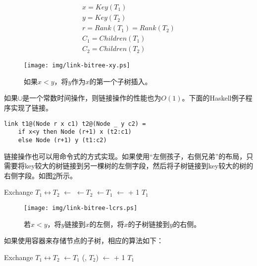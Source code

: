 \documentclass[UTF8]{article}
\begin{document}
\[
  \begin{array}{l}
  x = Key(T_1) \\
  y = Key(T_2) \\
  r = Rank(T_1) = Rank(T_2) \\
  C_1 = Children(T_1) \\
  C_2 = Children(T_2)
  \end{array}
\]

\begin{figure}[htbp]
  \centering
  \texttt{[image: img/link-bitree-xy.ps]}
  \caption{如果$x < y$，将$y$作为$x$的第一个子树插入。} \label{fig:link-xy}
\end{figure}

如果$\cup$是一个常数时间操作，则链接操作的性能也为$O(1)$。下面的Haskell例子程序实现了链接。

\lstset{language=Haskell}
\begin{lstlisting}
link t1@(Node r x c1) t2@(Node _ y c2) =
    if x<y then Node (r+1) x (t2:c1)
    else Node (r+1) y (t1:c2)
\end{lstlisting}

链接操作也可以用命令式的方式实现。如果使用“左侧孩子，右侧兄弟”的布局，只需要将key较大的树链接到另一棵树的左侧字段，然后将子树链接到key较大的树的右侧字段。如图\ref{fig:link-lcrs}所示。

\begin{algorithmic}[1]
    \State Exchange $T_1 \leftrightarrow T_2$
  \EndIf
  \State {} $\gets$ 
  \State {} $\gets T_2$
  \State {} $\gets T_1$
  \State {} $\gets$  + 1
  \State \Return $T_1$
\EndFunction
\end{algorithmic}

\begin{figure}[htbp]
  \centering
  \texttt{[image: img/link-bitree-lcrs.ps]}
  \caption{若$x < y$，将$y$链接到$x$的左侧，将$x$的子树链接到$y$的右侧。} \label{fig:link-lcrs}
\end{figure}

如果使用容器来存储节点的子树，相应的算法如下：

\begin{algorithmic}[1]
    \State Exchange $T_1 \leftrightarrow T_2$
  \EndIf
  \State {} $\gets T_1$
  \State {}(, $T_2$)
  \State {} $\gets$  + 1
  \State \Return $T_1$
\EndFunction
\end{algorithmic}
\end{document}
